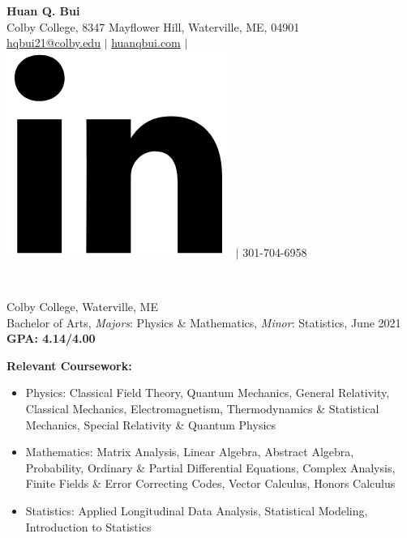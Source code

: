 \documentclass[letter, 9pt]{article}
\newcommand{\longunderline}[1]{\uline{#1\hfill\mbox{}}}
\begin{document}
	\begin{center}
		{\Large\textbf{Huan Q. Bui}}\\
		\smallskip
		Colby College, 8347 Mayflower Hill, Waterville, ME, 04901\\ \href{mailto:hqbui21@colby.edu}{\underline{hqbui21@colby.edu}} $\vert$ \href{https://huanqbui.com}{\underline{huanqbui.com}} $\vert$ \href{https://www.linkedin.com/in/huan-bui/}{\includegraphics[scale=0.04]{linkedin_logo.PNG}} $\vert$ 301-704-6958
	\end{center}
	\noindent \longunderline{\normalsize{{}}}\\
	\vspace{-7pt}
	
	
			\noindent Colby College, Waterville, ME\\
			Bachelor of Arts, \textit{Majors}: Physics \& Mathematics, \textit{Minor}: Statistics, June 2021 \hfill \textbf{GPA: 4.14/4.00}\\
			\vspace{-7pt}

			\noindent \textbf{Relevant Coursework:} 
			\begin{itemize}[noitemsep, nolistsep]
				\item Physics: Classical Field Theory, Quantum Mechanics, General Relativity, Classical Mechanics, Electromagnetism, Thermodynamics \& Statistical Mechanics, Special Relativity \& Quantum Physics
				\item Mathematics: Matrix Analysis, Linear Algebra, Abstract Algebra, Probability, Ordinary \& Partial Differential Equations, Complex Analysis, Finite Fields \& Error Correcting Codes, Vector Calculus, Honors Calculus
				\item Statistics: Applied Longitudinal Data Analysis, Statistical Modeling, Introduction to Statistics \\
			\end{itemize}
 
\end{document}
